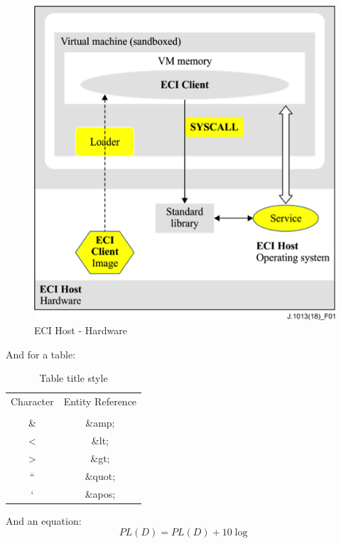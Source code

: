 \documentclass[a4paper,twocolumn]{article}
\begin{document}
\begin{figure}
\includegraphics[width=\columnwidth]{Figure1}
\caption{ECI Host - Hardware}\label{fig:fig1} 
\end{figure}

And for a table:

\begin{table}
\caption{Table title style}\label{tab:tab1} 
\begin{small}
\begin{tabu}{|c|c|}
\hline
 \rowfont{\bfseries}Character & Entity Reference\\ 
  & \\
\hline
\hline
\& & \&amp; \\
\hline
 < & \&lt;\\
 \hline
 > & \&gt; \\
\hline
``  & \&quot; \\
\hline
 ` & \&apos; \\
\hline
\end{tabu}
\end{small}
\end{table}

And an equation:
\begin{equation}\label{eq:eq1}
PL(D)=PL(D)+10\log 
\end{equation}
\end{document}
